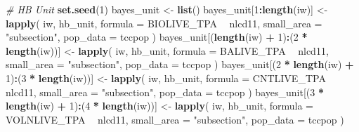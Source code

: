 \documentclass[12pt,twoside]{reedthesis}
\newenvironment{Shaded}{\begin{snugshade}}{\end{snugshade}}
\newcommand{\CommentTok}[1]{\textcolor[rgb]{0.56,0.35,0.01}{\textit{#1}}}
\newcommand{\DataTypeTok}[1]{\textcolor[rgb]{0.13,0.29,0.53}{#1}}
\newcommand{\DecValTok}[1]{\textcolor[rgb]{0.00,0.00,0.81}{#1}}
\newcommand{\KeywordTok}[1]{\textcolor[rgb]{0.13,0.29,0.53}{\textbf{#1}}}
\newcommand{\NormalTok}[1]{#1}
\newcommand{\OperatorTok}[1]{\textcolor[rgb]{0.81,0.36,0.00}{\textbf{#1}}}
\newcommand{\StringTok}[1]{\textcolor[rgb]{0.31,0.60,0.02}{#1}}
\begin{document}
\begin{Shaded}
\begin{Highlighting}[]
\CommentTok{# HB Unit}
\KeywordTok{set.seed}\NormalTok{(}\DecValTok{1}\NormalTok{)}
\NormalTok{bayes_unit <-}\StringTok{ }\KeywordTok{list}\NormalTok{()}
\NormalTok{bayes_unit[}\DecValTok{1}\OperatorTok{:}\KeywordTok{length}\NormalTok{(iw)] <-}\StringTok{ }\KeywordTok{lapply}\NormalTok{(}
\NormalTok{  iw,}
\NormalTok{  hb_unit,}
  \DataTypeTok{formula =}\NormalTok{ BIOLIVE_TPA }\OperatorTok{~}\StringTok{ }\NormalTok{nlcd11,}
  \DataTypeTok{small_area =} \StringTok{"subsection"}\NormalTok{,}
  \DataTypeTok{pop_data =}\NormalTok{ tccpop}
\NormalTok{)}
\NormalTok{bayes_unit[(}\KeywordTok{length}\NormalTok{(iw) }\OperatorTok{+}\StringTok{ }\DecValTok{1}\NormalTok{)}\OperatorTok{:}\NormalTok{(}\DecValTok{2} \OperatorTok{*}\StringTok{ }\KeywordTok{length}\NormalTok{(iw))] <-}
\StringTok{  }\KeywordTok{lapply}\NormalTok{(}
\NormalTok{    iw,}
\NormalTok{    hb_unit,}
    \DataTypeTok{formula =}\NormalTok{ BALIVE_TPA }\OperatorTok{~}\StringTok{ }\NormalTok{nlcd11,}
    \DataTypeTok{small_area =} \StringTok{"subsection"}\NormalTok{,}
    \DataTypeTok{pop_data =}\NormalTok{ tccpop}
\NormalTok{  )}
\NormalTok{bayes_unit[(}\DecValTok{2} \OperatorTok{*}\StringTok{ }\KeywordTok{length}\NormalTok{(iw) }\OperatorTok{+}\StringTok{ }\DecValTok{1}\NormalTok{)}\OperatorTok{:}\NormalTok{(}\DecValTok{3} \OperatorTok{*}\StringTok{ }\KeywordTok{length}\NormalTok{(iw))] <-}
\StringTok{  }\KeywordTok{lapply}\NormalTok{(}
\NormalTok{    iw,}
\NormalTok{    hb_unit,}
    \DataTypeTok{formula =}\NormalTok{ CNTLIVE_TPA }\OperatorTok{~}\StringTok{ }\NormalTok{nlcd11,}
    \DataTypeTok{small_area =} \StringTok{"subsection"}\NormalTok{,}
    \DataTypeTok{pop_data =}\NormalTok{ tccpop}
\NormalTok{  )}
\NormalTok{bayes_unit[(}\DecValTok{3} \OperatorTok{*}\StringTok{ }\KeywordTok{length}\NormalTok{(iw) }\OperatorTok{+}\StringTok{ }\DecValTok{1}\NormalTok{)}\OperatorTok{:}\NormalTok{(}\DecValTok{4} \OperatorTok{*}\StringTok{ }\KeywordTok{length}\NormalTok{(iw))] <-}
\StringTok{  }\KeywordTok{lapply}\NormalTok{(}
\NormalTok{    iw,}
\NormalTok{    hb_unit,}
    \DataTypeTok{formula =}\NormalTok{ VOLNLIVE_TPA }\OperatorTok{~}\StringTok{ }\NormalTok{nlcd11,}
    \DataTypeTok{small_area =} \StringTok{"subsection"}\NormalTok{,}
    \DataTypeTok{pop_data =}\NormalTok{ tccpop}
\NormalTok{  )}


\end{Highlighting}
\end{Shaded}
\end{document}
